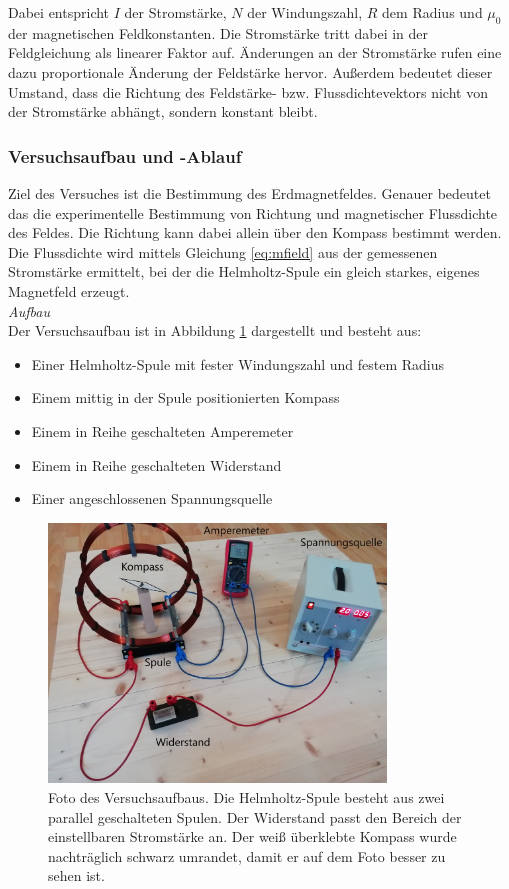 Dabei entspricht $I$ der Stromstärke, $N$ der Windungszahl, $R$ dem Radius und $\mu_{0}$ der magnetischen Feldkonstanten. Die Stromstärke tritt dabei in der Feldgleichung als linearer Faktor auf. Änderungen an der Stromstärke rufen eine dazu proportionale Änderung der Feldstärke hervor. Außerdem bedeutet dieser Umstand, dass die Richtung des Feldstärke- bzw. Flussdichtevektors nicht von der Stromstärke abhängt, sondern konstant bleibt.\\

\subsubsection{Versuchsaufbau und -Ablauf}
\label{sec-2-3-4}
Ziel des Versuches ist die Bestimmung des Erdmagnetfeldes. Genauer bedeutet das die experimentelle Bestimmung von Richtung und magnetischer Flussdichte des Feldes. Die Richtung kann dabei allein über den Kompass bestimmt werden. Die Flussdichte wird mittels Gleichung \ref{eq:mfield} aus der gemessenen Stromstärke ermittelt, bei der die Helmholtz-Spule ein gleich starkes, eigenes Magnetfeld erzeugt.\\

\textit{Aufbau}\\
Der Versuchsaufbau ist in Abbildung \ref{img:experiment-devices} dargestellt und besteht aus: 
\begin{itemize}
	\setlength{\itemsep}{-5pt}
	\item Einer Helmholtz-Spule mit fester Windungszahl und festem Radius
	\item Einem mittig in der Spule positionierten Kompass
	\item Einem in Reihe geschalteten Amperemeter
	\item Einem in Reihe geschalteten Widerstand	
	\item Einer angeschlossenen Spannungsquelle
\end{itemize}

\begin{figure}[h!]
	\centering
	\includegraphics[width=0.8\textwidth]{images/papers/setup_labled.jpg}
	\caption{Foto des Versuchsaufbaus. Die Helmholtz-Spule besteht aus zwei parallel geschalteten Spulen. Der Widerstand passt den Bereich der einstellbaren Stromstärke an. Der weiß überklebte Kompass wurde nachträglich schwarz umrandet, damit er auf dem Foto besser zu sehen ist.}
	\label{img:experiment-devices}
\end{figure}

